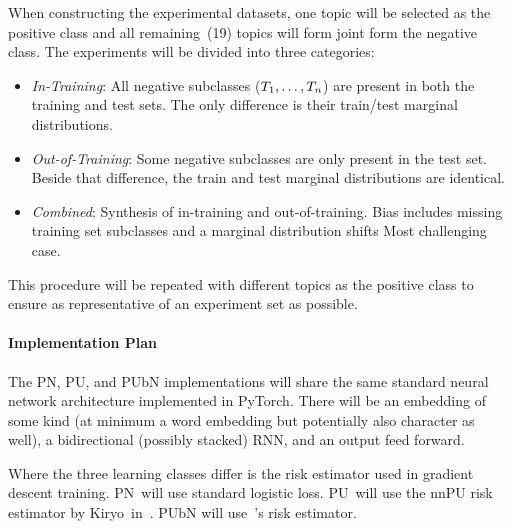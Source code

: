 \documentclass[10pt]{article}
\begin{document}
  When constructing the experimental datasets, one topic will be selected as the positive class and all remaining~(19) topics will form joint form the negative class.  The experiments will be divided into three categories:

  \begin{itemize}
    \item \textit{In-Training}: All negative subclasses (${T_1,\ldots,T_n}$) are present in both the training and test sets.  The only difference is their train/test marginal distributions.

    \item \textit{Out-of-Training}: Some negative subclasses are only present in the test set. Beside that difference, the train and test marginal distributions are identical.

    \item \textit{Combined}: Synthesis of in-training and out-of-training.  Bias includes missing training set subclasses and a marginal distribution shifts  Most challenging case.
  \end{itemize}

  \noindent
  This procedure will be repeated with different topics as the positive class to ensure as representative of an experiment set as possible.

  \paragraph{Implementation Plan} The PN, PU, and PUbN implementations will share the same standard neural network architecture implemented in PyTorch.  There will be an embedding of some kind (at minimum a word embedding but potentially also character as well), a bidirectional (possibly stacked) RNN, and an output feed forward.

  Where the three learning classes differ is the risk estimator used in gradient descent training.  PN~will use standard logistic loss.  PU~will use the nnPU risk estimator by Kiryo\etal\ in~\cite{Kiryo:2017}.  PUbN will use~\cite{Hsieh:2019}'s risk estimator.

  
  
\end{document}
